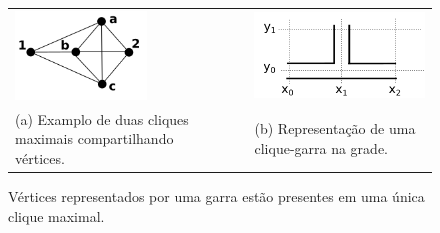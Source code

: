 \begin{figure}[ht]
  \centering
  \begin{tabular}{  p{5cm} p{0.7cm} p{5cm} }
    \includegraphics[width=3.5cm]{img/lemaClaw2Maximais} & &
    \includegraphics[width=5.5cm]{img/claw2}
    \\
    \footnotesize %
    (a)  \footnotesize Examplo de duas cliques maximais compartilhando vértices. && \footnotesize (b) Representação de uma clique-garra na grade.\\
  \end{tabular}

 \caption{Vértices representados por uma garra  estão presentes em uma única clique maximal.} \label{fig:lemaClaw2Maximais}
\end{figure}